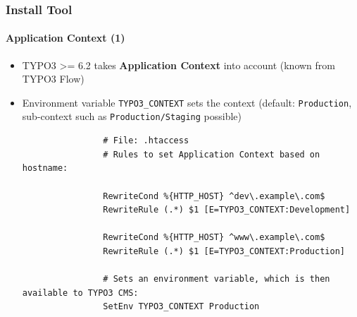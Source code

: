 
\begin{frame}[fragile]
	\frametitle{Install Tool}
	\framesubtitle{Application Context (1)}

	\begin{itemize}
		\item TYPO3 >= 6.2 takes \textbf{Application Context} into account\newline
			\smaller(known from TYPO3 Flow)\normalsize
		\item Environment variable \texttt{TYPO3\_CONTEXT} sets the context\newline
			\smaller(default: \texttt{Production}, sub-context such as \texttt{Production/Staging} possible)\normalsize

			\begin{lstlisting}
				# File: .htaccess
				# Rules to set Application Context based on hostname:

				RewriteCond %{HTTP_HOST} ^dev\.example\.com$
				RewriteRule (.*) $1 [E=TYPO3_CONTEXT:Development]

				RewriteCond %{HTTP_HOST} ^www\.example\.com$
				RewriteRule (.*) $1 [E=TYPO3_CONTEXT:Production]

				# Sets an environment variable, which is then available to TYPO3 CMS:
				SetEnv TYPO3_CONTEXT Production
			\end{lstlisting}

	\end{itemize}

\end{frame}


